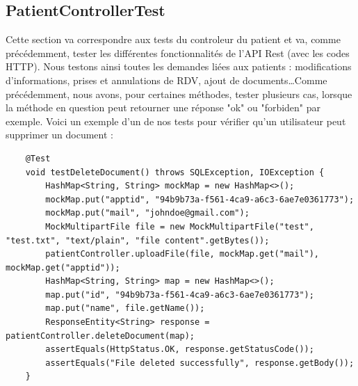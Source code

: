 \documentclass[a4paper]{report}
\begin{document}
\subsection{PatientControllerTest}
Cette section va correspondre aux tests du controleur du patient et va, comme précédemment, tester les différentes fonctionnalités de l'API Rest (avec les codes HTTP).
Nous testons ainsi toutes les demandes liées aux patients : modifications d'informations, prises et annulations de RDV, ajout de documents\dots Comme précédemment, nous avons, pour certaines méthodes,
tester plusieurs cas, lorsque la méthode en question peut retourner une réponse "ok" ou "forbiden" par exemple.
Voici un exemple d'un de nos tests pour vérifier qu'un utilisateur peut supprimer un document : 
\begin{lstlisting}
    @Test
    void testDeleteDocument() throws SQLException, IOException {
        HashMap<String, String> mockMap = new HashMap<>();
        mockMap.put("apptid", "94b9b73a-f561-4ca9-a6c3-6ae7e0361773");
        mockMap.put("mail", "johndoe@gmail.com");
        MockMultipartFile file = new MockMultipartFile("test", "test.txt", "text/plain", "file content".getBytes());
        patientController.uploadFile(file, mockMap.get("mail"), mockMap.get("apptid"));
        HashMap<String, String> map = new HashMap<>();
        map.put("id", "94b9b73a-f561-4ca9-a6c3-6ae7e0361773");
        map.put("name", file.getName());
        ResponseEntity<String> response = patientController.deleteDocument(map);
        assertEquals(HttpStatus.OK, response.getStatusCode());
        assertEquals("File deleted successfully", response.getBody());
    }
\end{lstlisting}
\end{document}

